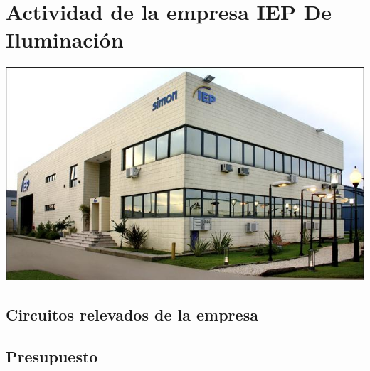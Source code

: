 \documentclass[12pt,titlepage]{report}
\begin{document}
\chapter{Actividad de la empresa IEP De Iluminación}

\begin{center}
 \includegraphics[scale=0.75]{./Images/iep-instalacion.png}
\end{center}



\pagebreak
\section{Circuitos relevados de la empresa}




\pagebreak
\section{Presupuesto}

\end{document}
